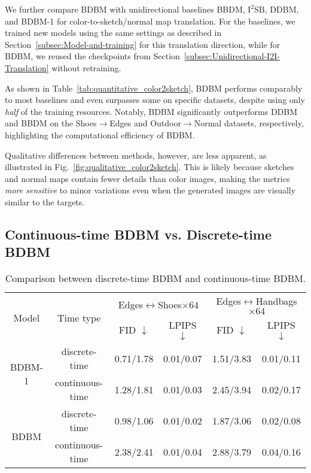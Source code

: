 We further compare BDBM with unidirectional baselines BBDM, $\text{I}^{2}\text{SB}$,
DDBM, and BDBM-1 for color-to-sketch/normal map translation. For the
baselines, we trained new models using the same settings as described
in Section~\ref{subsec:Model-and-training} for this translation
direction, while for BDBM, we reused the checkpoints from Section~\ref{subsec:Unidirectional-I2I-Translation}
without retraining. 

As shown in Table~\ref{tab:quantitative_color2sketch}, BDBM performs
comparably to most baselines and even surpasses some on specific datasets,
despite using only \emph{half} of the training resources. Notably,
BDBM significantly outperforms DDBM and BBDM on the Shoes$\rightarrow$Edges
and Outdoor$\rightarrow$Normal datasets, respectively, highlighting
the computational efficiency of BDBM. 

Qualitative differences between methods, however, are less apparent,
as illustrated in Fig.~\ref{fig:qualitative_color2sketch}. This
is likely because sketches and normal maps contain fewer details than
color images, making the metrics \emph{more sensitive} to minor variations
even when the generated images are visually similar to the targets.


\subsection{Continuous-time BDBM vs. Discrete-time BDBM\label{subsec:Continuous-vs-Discrete}}

\begin{table}
\begin{centering}
\begin{tabular}{cccccc}
\toprule 
\multirow{2}{*}{Model} & \multirow{2}{*}{Time type} & \multicolumn{2}{c}{Edges$\leftrightarrow$Shoes$\times64$} & \multicolumn{2}{c}{Edges$\leftrightarrow$Handbags$\times64$}\tabularnewline
\cmidrule{3-6} 
 &  & FID $\downarrow$ & LPIPS $\downarrow$ & FID $\downarrow$ & LPIPS $\downarrow$\tabularnewline
\midrule
\midrule 
\multirow{2}{*}{BDBM-1} & discrete-time & 0.71/1.78 & 0.01/0.07 & 1.51/3.83 & 0.01/0.11\tabularnewline
 & continuous-time & 1.28/1.81 & 0.01/0.03 & 2.45/3.94 & 0.02/0.17\tabularnewline
\midrule
\midrule 
\multirow{2}{*}{BDBM} & discrete-time  & 0.98/1.06 & 0.01/0.02 & 1.87/3.06 & 0.02/0.08\tabularnewline
 & continuous-time & 2.38/2.41 & 0.01/0.04 & 2.88/3.79 & 0.04/0.16\tabularnewline
\bottomrule
\end{tabular}
\par\end{centering}
\caption{Comparison between discrete-time BDBM and continuous-time BDBM.\label{tab:disc_vs_cont_BDBM}}
\end{table}

